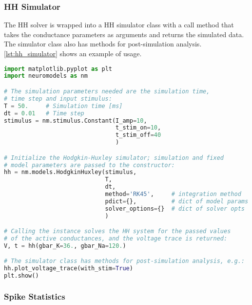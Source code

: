 \subsubsection*{HH Simulator}

The HH solver is wrapped into a HH simulator class with a call method that takes the conductance parameters as arguments and returns the simulated data. The simulator class also has methods for post-simulation analysis. \cref{lst:hh_simulator} shows an example of usage.

\begin{lstlisting}[language=python, label={lst:hh_simulator}, caption={Example usage of the HH simulator.}]
import matplotlib.pyplot as plt
import neuromodels as nm

# The simulation parameters needed are the simulation time,
# time step and input stimulus:
T = 50.     # Simulation time [ms]
dt = 0.01   # Time step
stimulus = nm.stimulus.Constant(I_amp=10,
                                t_stim_on=10,
                                t_stim_off=40
                                )

# Initialize the Hodgkin-Huxley simulator; simulation and fixed
# model parameters are passed to the constructor:
hh = nm.models.HodgkinHuxley(stimulus,
                             T,
                             dt,
                             method='RK45',     # integration method
                             pdict={},          # dict of model params
                             solver_options={}  # dict of solver opts
                             )

# Calling the instance solves the HH system for the passed values
# of the active conductances, and the voltage trace is returned:
V, t = hh(gbar_K=36., gbar_Na=120.)

# The simulator class has methods for post-simulation analysis, e.g.:
hh.plot_voltage_trace(with_stim=True)
plt.show()
\end{lstlisting}

\subsubsection*{Spike Statistics}

